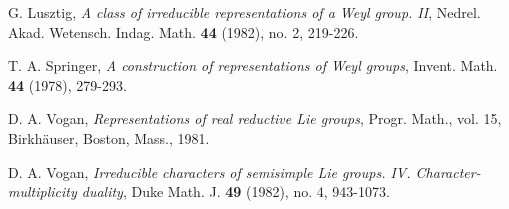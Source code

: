 \documentclass[12pt, a4paper]{amsart}
\numberwithin{equation}{section}
\begin{document}
\begin{thebibliography}{99}
    G. Lusztig, \textit{A class of irreducible representations of a Weyl group. II}, Nedrel. Akad. Wetensch. Indag. Math. \textbf{44} (1982), no. 2, 219-226.

    T. A. Springer, \textit{A construction of representations of Weyl groups}, Invent. Math. \textbf{44} (1978), 279-293.



   D. A. Vogan, \textit{Representations of real reductive Lie groups}, Progr. Math., vol. 15, Birkh\"{a}user, Boston, Mass., 1981.

   D. A. Vogan, \textit{Irreducible characters of semisimple Lie groups. IV. Character-multiplicity duality}, Duke Math. J. \textbf{49} (1982), no. 4, 943-1073.











\end{thebibliography}
\end{document}
